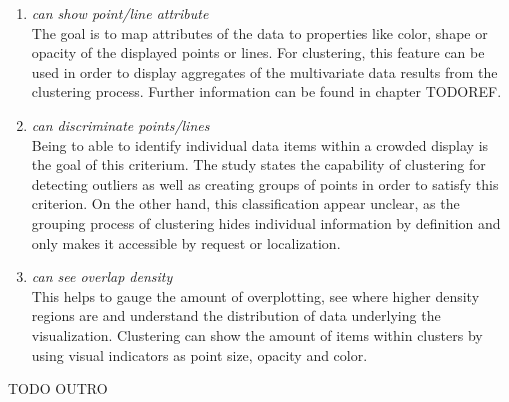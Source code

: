 \begin{enumerate}
\item \textit{can show point/line attribute}
\\ The goal is to map attributes of the data to properties like color, shape or opacity of the displayed points or lines. For clustering, this feature can be used in order to display aggregates of the multivariate data results from the clustering process. Further information can be found in chapter TODOREF.

\item \textit{can discriminate points/lines}
\\ Being to able to identify individual data items within a crowded display is the goal of this criterium. The study states the capability of clustering for detecting outliers as well as creating groups of points in order to satisfy this criterion. On the other hand, this classification appear unclear, as the grouping process of clustering hides individual information by definition and only makes it accessible by request or localization. 

\item \textit{can see overlap density}
\\ This helps to gauge the amount of overplotting, see where higher density regions are and understand the distribution of data underlying the visualization. Clustering can show the amount of items within clusters by using visual indicators as point size, opacity and color.  

\end{enumerate}

TODO OUTRO
